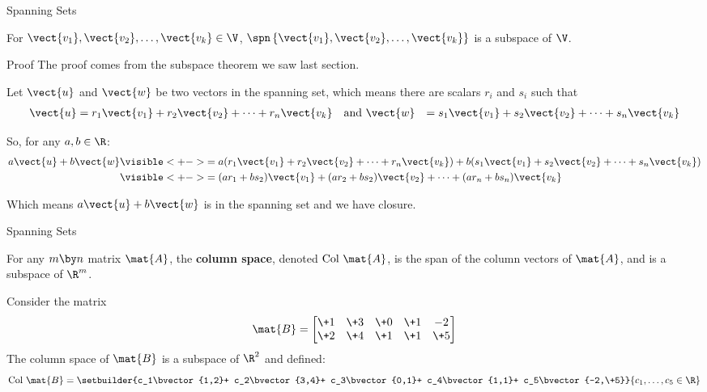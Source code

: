 \documentclass{beamer}
\begin{document}
\begin{frame}{Spanning Sets}
\onslide<+->
\begin{theorem}
For $\vect{v_1},\vect{v_2},\ldots,\vect{v_k}\in\V$, $\spn\left\{\vect{v_1},\vect{v_2},\ldots,\vect{v_k}\right\}$ is a subspace of $\V$.
\end{theorem}
\onslide<+->

\begin{block}{Proof}
The proof comes from the subspace theorem we saw last section.

\onslide<+->
Let $\vect{u}$ and $\vect{w}$ be two vectors in the spanning set, which means there are scalars $r_i$ and $s_i$ such that
\begin{equation*}
\begin{aligned}
\vect{u} & =r_1\vect{v_1}+ r_2\vect{v_2}+\cdots+r_n\vect{v_k} & \text{and } &
\vect{w} & =s_1\vect{v_1}+ s_2\vect{v_2}+\cdots+s_n\vect{v_k}
\end{aligned}
\end{equation*}

\onslide<+->
So, for any $a,b\in\R$:
\begin{equation*}
\begin{split}
a\vect{u}+b\vect{w} &\visible<+->{=a(r_1\vect{v_1}+ r_2\vect{v_2}+\cdots+r_n\vect{v_k}) + b(s_1\vect{v_1}+ s_2\vect{v_2}+\cdots+s_n\vect{v_k})}\\
&\visible<+->{=(ar_1+bs_2)\vect{v_1}+ (ar_2+bs_2)\vect{v_2}+\cdots+(ar_n+bs_n)\vect{v_k}}
\end{split}
\end{equation*}

\onslide<+->
Which means $a\vect{u}+b\vect{w}$ is in the spanning set and we have closure.
\end{block}
\end{frame}

\begin{frame}{Spanning Sets}
\begin{definition}
For any $m \by n$ matrix $\mat{A}$, the \textbf{column space}, denoted $\text{Col }\mat{A}$, is the span of the column vectors of $\mat{A}$, and is a subspace of $\R^m$.
\end{definition}\pause

\begin{example}
Consider the matrix
\begin{equation*}
\mat{B}=
\begin{bmatrix}
\+1 & \+3 & \+0 & \+1 &  -2 \\
\+2 & \+4 & \+1 & \+1 & \+5 \\
\end{bmatrix}
\end{equation*}\pause
The column space of $\mat{B}$ is a subspace of $\R^2$ and defined:
\begin{equation*}
\text{Col }\mat{B} = 
\setbuilder{c_1\bvector{1,2}+
			c_2\bvector{3,4}+
			c_3\bvector{0,1}+
			c_4\bvector{1,1}+
			c_5\bvector{-2,\+5}}
			{c_1,\dots,c_5\in\R}
\end{equation*}
\end{example}
\end{frame}
\end{document}
